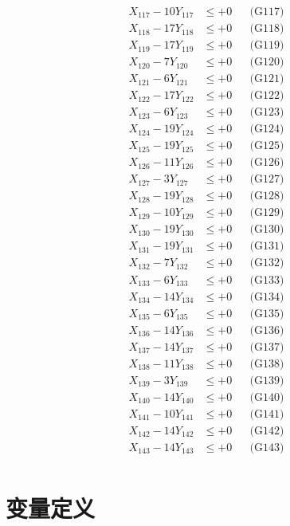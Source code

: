 \documentclass[a4paper,10pt]{article}
\begin{document}
{\begin{align}
X_{117} - 10Y_{117} &\leq +0 && \text{(G117)} \\
\allowbreak
X_{118} - 17Y_{118} &\leq +0 && \text{(G118)} \\
X_{119} - 17Y_{119} &\leq +0 && \text{(G119)} \\
X_{120} - 7Y_{120} &\leq +0 && \text{(G120)} \\
X_{121} - 6Y_{121} &\leq +0 && \text{(G121)} \\
X_{122} - 17Y_{122} &\leq +0 && \text{(G122)} \\
X_{123} - 6Y_{123} &\leq +0 && \text{(G123)} \\
X_{124} - 19Y_{124} &\leq +0 && \text{(G124)} \\
X_{125} - 19Y_{125} &\leq +0 && \text{(G125)} \\
X_{126} - 11Y_{126} &\leq +0 && \text{(G126)} \\
X_{127} - 3Y_{127} &\leq +0 && \text{(G127)} \\
\allowbreak
X_{128} - 19Y_{128} &\leq +0 && \text{(G128)} \\
X_{129} - 10Y_{129} &\leq +0 && \text{(G129)} \\
X_{130} - 19Y_{130} &\leq +0 && \text{(G130)} \\
X_{131} - 19Y_{131} &\leq +0 && \text{(G131)} \\
X_{132} - 7Y_{132} &\leq +0 && \text{(G132)} \\
X_{133} - 6Y_{133} &\leq +0 && \text{(G133)} \\
X_{134} - 14Y_{134} &\leq +0 && \text{(G134)} \\
X_{135} - 6Y_{135} &\leq +0 && \text{(G135)} \\
X_{136} - 14Y_{136} &\leq +0 && \text{(G136)} \\
X_{137} - 14Y_{137} &\leq +0 && \text{(G137)} \\
\allowbreak
X_{138} - 11Y_{138} &\leq +0 && \text{(G138)} \\
X_{139} - 3Y_{139} &\leq +0 && \text{(G139)} \\
X_{140} - 14Y_{140} &\leq +0 && \text{(G140)} \\
X_{141} - 10Y_{141} &\leq +0 && \text{(G141)} \\
X_{142} - 14Y_{142} &\leq +0 && \text{(G142)} \\
X_{143} - 14Y_{143} &\leq +0 && \text{(G143)} \\
\end{align}
}

\section{变量定义}
\end{document}
